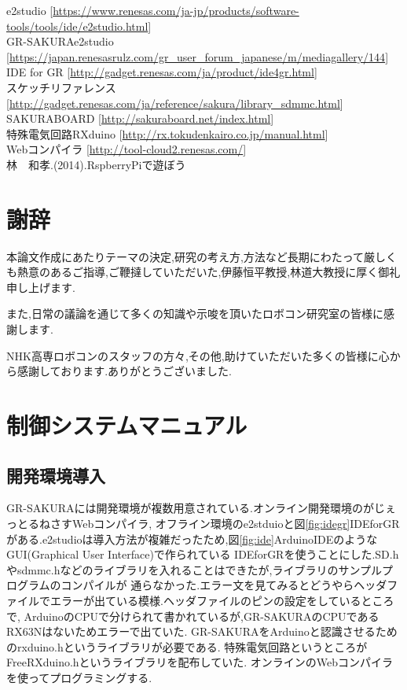 \documentclass[12pt,oneside]{paper}
\begin{document}
\begin{thebibliography}{8}
e2studio [\url{https://www.renesas.com/ja-jp/products/software-tools/tools/ide/e2studio.html}] \\
GR-SAKURAe2studio [\url{https://japan.renesasrulz.com/gr_user_forum_japanese/m/mediagallery/144}] \\
IDE for GR [\url{http://gadget.renesas.com/ja/product/ide4gr.html}] \\
スケッチリファレンス [\url{http://gadget.renesas.com/ja/reference/sakura/library_sdmmc.html}] \\
SAKURABOARD [\url{http://sakuraboard.net/index.html}] \\
特殊電気回路RXduino [\url{http://rx.tokudenkairo.co.jp/manual.html}] \\
Webコンパイラ [\url{http://tool-cloud2.renesas.com/}] \\
林　和孝.(2014).RspberryPiで遊ぼう
\end{thebibliography}


\chapter*{謝辞}

本論文作成にあたりテーマの決定,研究の考え方,方法など長期にわたって厳しくも熱意のあるご指導,ご鞭撻していただいた,伊藤恒平教授,林道大教授に厚く御礼申し上げます.


また,日常の議論を通じて多くの知識や示唆を頂いたロボコン研究室の皆様に感謝します.


NHK高専ロボコンのスタッフの方々,その他,助けていただいた多くの皆様に心から感謝しております.ありがとうございました.

\appendix
\chapter{制御システムマニュアル}

\section{開発環境導入}
GR-SAKURAには開発環境が複数用意されている.オンライン開発環境のがじぇっとるねさすWebコンパイラ,
オフライン環境のe2stduioと図\ref{fig:idegr}IDEforGRがある.e2studioは導入方法が複雑だったため,図\ref{fig:ide}ArduinoIDEのようなGUI(Graphical User Interface)で作られている
IDEforGRを使うことにした.SD.hやsdmmc.hなどのライブラリを入れることはできたが,ライブラリのサンプルプログラムのコンパイルが
通らなかった.エラー文を見てみるとどうやらヘッダファイルでエラーが出ている模様.ヘッダファイルのピンの設定をしているところで,
ArduinoのCPUで分けられて書かれているが,GR-SAKURAのCPUであるRX63Nはないためエラーで出ていた.
GR-SAKURAをArduinoと認識させるためのrxduino.hというライブラリが必要である.
特殊電気回路というところがFreeRXduino.hというライブラリを配布していた.
オンラインのWebコンパイラを使ってプログラミングする.
\end{document}
